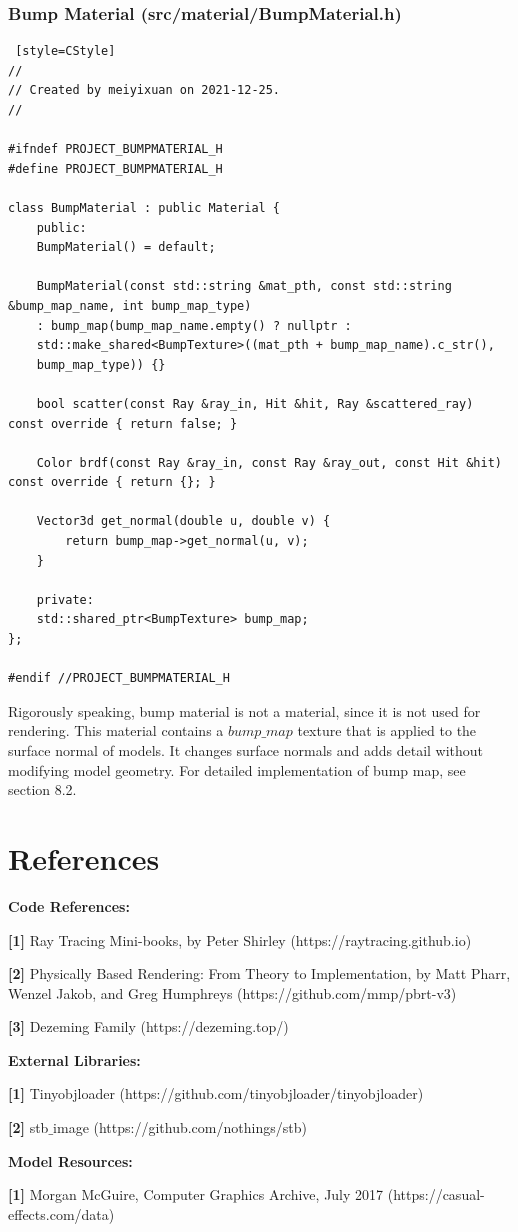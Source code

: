 \documentclass[utf8]{article}
\begin{document}
\subsubsection{Bump Material (src/material/BumpMaterial.h)}
\begin{lstlisting} [style=CStyle]
//
// Created by meiyixuan on 2021-12-25.
//

#ifndef PROJECT_BUMPMATERIAL_H
#define PROJECT_BUMPMATERIAL_H

class BumpMaterial : public Material {
	public:
	BumpMaterial() = default;
	
	BumpMaterial(const std::string &mat_pth, const std::string &bump_map_name, int bump_map_type)
	: bump_map(bump_map_name.empty() ? nullptr :
	std::make_shared<BumpTexture>((mat_pth + bump_map_name).c_str(),
	bump_map_type)) {}
	
	bool scatter(const Ray &ray_in, Hit &hit, Ray &scattered_ray) const override { return false; }
	
	Color brdf(const Ray &ray_in, const Ray &ray_out, const Hit &hit) const override { return {}; }
	
	Vector3d get_normal(double u, double v) {
		return bump_map->get_normal(u, v);
	}
	
	private:
	std::shared_ptr<BumpTexture> bump_map;
};

#endif //PROJECT_BUMPMATERIAL_H

\end{lstlisting}
Rigorously speaking, bump material is not a material, since it is not used for rendering. This material contains a $bump\_map$ texture that is applied to the surface normal of models. It changes surface normals and adds detail without modifying model geometry. For detailed implementation of bump map, see section 8.2.


\section{References}
\noindent
\textbf{Code References: }

\noindent
\textbf{[1]} Ray Tracing Mini-books, by Peter Shirley (https://raytracing.github.io)

\noindent
\textbf{[2]} Physically Based Rendering: From Theory to Implementation, by Matt Pharr, Wenzel Jakob, and Greg Humphreys (https://github.com/mmp/pbrt-v3)

\noindent
\textbf{[3]} Dezeming Family (https://dezeming.top/)

\noindent
\textbf{External Libraries: }

\noindent
\textbf{[1]} Tinyobjloader (https://github.com/tinyobjloader/tinyobjloader)

\noindent
\textbf{[2]} stb$\_$image (https://github.com/nothings/stb)

\noindent
\textbf{Model Resources: }

\noindent
\textbf{[1]} Morgan McGuire, Computer Graphics Archive, July 2017 (https://casual-effects.com/data)
\end{document}
